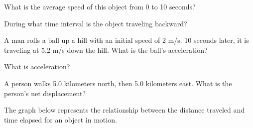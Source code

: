 \documentclass[10pt]{examdesign}
\begin{document}
\begin{multiplechoice} [title={Multiple Choice},
	rearrange=yes]
\begin{block}
\begin{question}

What is the average speed of this object from 0 to 10 seconds?

\end{question}

\begin{question}
During what time interval is the object traveling backward?


	\end{question}

\end{block}

	\begin{question}
	A man rolls a ball up a hill with an initial speed of 2 m/s. 10 seconds later, it is traveling at 5.2 m/s down the hill.  What is the ball's acceleration?

\end{question}

\begin{question}
	What is acceleration?

\end{question}


\begin{question}
A person walks 5.0 kilometers north, then 5.0 kilometers east. What is the person's net displacement?

\end{question}

\begin{question}

The graph below represents the relationship between the distance traveled and time elapsed for an object in motion.  



\end{question}
\end{multiplechoice}
\end{document}
